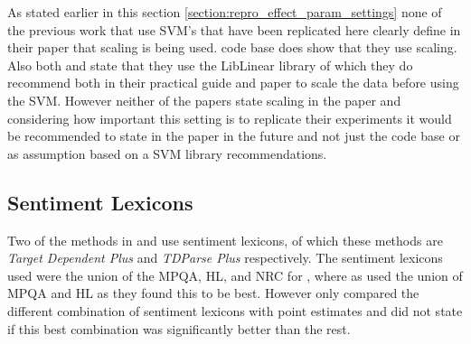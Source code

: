 As stated earlier in this section \ref{section:repro_effect_param_settings} none of the previous work that use SVM's that have been replicated here clearly define in their paper that scaling is being used. \citet{wang-etal-2017-tdparse} code base does show that they use scaling. Also both \citet{vo2015target} and \citet{wang-etal-2017-tdparse} state that they use the LibLinear library \citep{fan2008liblinear} of which they do recommend both in their practical guide \citep{hsu2003practical} and paper \citep{fan2008liblinear} to scale the data before using the SVM. However neither of the papers state scaling in the paper and considering how important this setting is to replicate their experiments it would be recommended to state in the paper in the future and not just the code base or as assumption based on a SVM library recommendations.
\newpage
\FloatBarrier
\subsection{Sentiment Lexicons}
Two of the methods in \citet{vo2015target} and \citet{wang-etal-2017-tdparse} use sentiment lexicons, of which these methods are \textit{Target Dependent Plus} and \textit{TDParse Plus} respectively. The sentiment lexicons used were the union of the MPQA, HL, and NRC for \citet{wang-etal-2017-tdparse}, where as \citet{vo2015target} used the union of MPQA and HL as they found this to be best. However \citet{vo2015target} only compared the different combination of sentiment lexicons with point estimates and did not state if this best combination was significantly better than the rest.

